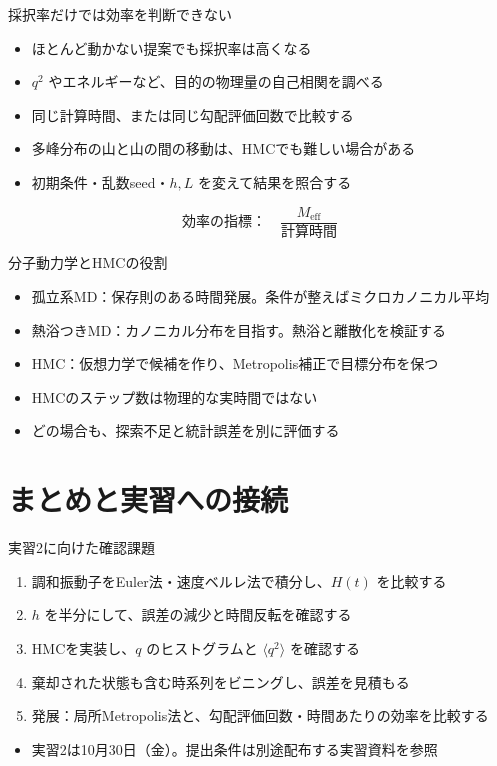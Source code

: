 \documentclass[10pt,aspectratio=169]{beamer}
\begin{document}
\begin{frame}{採択率だけでは効率を判断できない}
\begin{itemize}
\item ほとんど動かない提案でも採択率は高くなる
\item $q^2$ やエネルギーなど、目的の物理量の自己相関を調べる
\item 同じ計算時間、または同じ勾配評価回数で比較する
\item 多峰分布の山と山の間の移動は、HMCでも難しい場合がある
\item 初期条件・乱数seed・$h,L$ を変えて結果を照合する
\end{itemize}
\[
\text{効率の指標：}\quad
\frac{M_{\mathrm{eff}}}{\text{計算時間}}
\]
\end{frame}

\begin{frame}{分子動力学とHMCの役割}
\begin{itemize}
\item 孤立系MD：保存則のある時間発展。条件が整えばミクロカノニカル平均
\item 熱浴つきMD：カノニカル分布を目指す。熱浴と離散化を検証する
\item HMC：仮想力学で候補を作り、Metropolis補正で目標分布を保つ
\item HMCのステップ数は物理的な実時間ではない
\item どの場合も、探索不足と統計誤差を別に評価する
\end{itemize}
\end{frame}

\section{まとめと実習への接続}

\begin{frame}{実習2に向けた確認課題}
\begin{enumerate}
\item 調和振動子をEuler法・速度ベルレ法で積分し、$H(t)$ を比較する
\item $h$ を半分にして、誤差の減少と時間反転を確認する
\item HMCを実装し、$q$ のヒストグラムと $\langle q^2\rangle$ を確認する
\item 棄却された状態も含む時系列をビニングし、誤差を見積もる
\item 発展：局所Metropolis法と、勾配評価回数・時間あたりの効率を比較する
\end{enumerate}
\begin{itemize}
\item 実習2は10月30日（金）。提出条件は別途配布する実習資料を参照
\end{itemize}
\end{frame}
\end{document}
